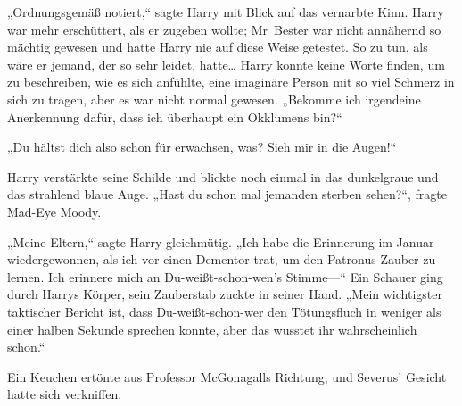 „Ordnungsgemäß notiert,“ sagte Harry mit Blick auf das vernarbte Kinn. Harry war mehr erschüttert, als er zugeben wollte; Mr~Bester war nicht annähernd so mächtig gewesen und hatte Harry nie auf diese Weise getestet. So zu tun, als wäre er jemand, der so sehr leidet, hatte… Harry konnte keine Worte finden, um zu beschreiben, wie es sich anfühlte, eine imaginäre Person mit so viel Schmerz in sich zu tragen, aber es war nicht normal gewesen.
„Bekomme ich irgendeine Anerkennung dafür, dass ich überhaupt ein Okklumens bin?“

„Du hältst dich also schon für erwachsen, was? Sieh mir in die Augen!“

Harry verstärkte seine Schilde und blickte noch einmal in das dunkelgraue und das strahlend blaue Auge. „Hast du schon mal jemanden sterben sehen?“, fragte Mad-Eye Moody.


„Meine Eltern,“ sagte Harry gleichmütig. „Ich habe die Erinnerung im Januar wiedergewonnen, als ich vor einen Dementor trat, um den Patronus-Zauber zu lernen. Ich erinnere mich an Du-weißt-schon-wen's Stimme—“ Ein Schauer ging durch Harrys Körper, sein Zauberstab zuckte in seiner Hand. „Mein wichtigster taktischer Bericht ist, dass Du-weißt-schon-wer den Tötungsfluch in weniger als einer halben Sekunde sprechen konnte, aber das wusstet ihr wahrscheinlich schon.“

Ein Keuchen ertönte aus Professor McGonagalls Richtung, und Severus' Gesicht hatte sich verkniffen.

